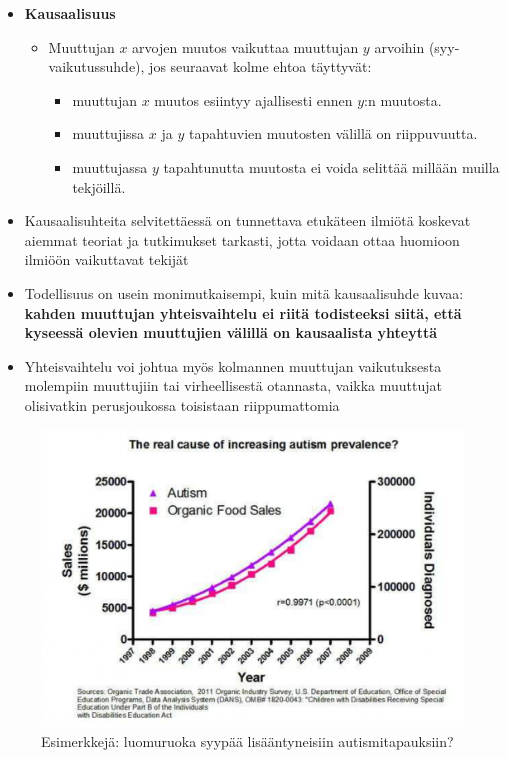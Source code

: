 \documentclass[
]{book}
\providecommand{\tightlist}{%
  \setlength{\itemsep}{0pt}\setlength{\parskip}{0pt}}
\begin{document}
\FloatBarrier

\begin{itemize}
\item
  \textbf{Kausaalisuus}

  \begin{itemize}
  \tightlist
  \item
    Muuttujan \(x\) arvojen muutos vaikuttaa muuttujan \(y\) arvoihin (syy-vaikutussuhde), jos seuraavat kolme ehtoa täyttyvät:

    \begin{itemize}
    \tightlist
    \item
      muuttujan \(x\) muutos esiintyy ajallisesti ennen \(y\):n muutosta.
    \item
      muuttujissa \(x\) ja \(y\) tapahtuvien muutosten välillä on riippuvuutta.
    \item
      muuttujassa \(y\) tapahtunutta muutosta ei voida selittää millään muilla tekjöillä.
    \end{itemize}
  \end{itemize}
\item
  Kausaalisuhteita selvitettäessä on tunnettava etukäteen ilmiötä koskevat aiemmat teoriat ja tutkimukset tarkasti, jotta voidaan ottaa huomioon ilmiöön vaikuttavat tekijät
\item
  Todellisuus on usein monimutkaisempi, kuin mitä kausaalisuhde kuvaa: \textbf{kahden muuttujan yhteisvaihtelu ei riitä todisteeksi siitä, että kyseessä olevien muuttujien välillä on kausaalista yhteyttä}
\item
  Yhteisvaihtelu voi johtua myös kolmannen muuttujan vaikutuksesta molempiin muuttujiin tai virheellisestä otannasta, vaikka muuttujat olisivatkin perusjoukossa toisistaan riippumattomia
\end{itemize}

\FloatBarrier

\begin{figure}

{\centering \includegraphics[width=0.75\linewidth]{images/causality2} 

}

\caption{Esimerkkejä: luomuruoka syypää lisääntyneisiin autismitapauksiin?}\label{fig:unnamed-chunk-4}
\end{figure}
\end{document}

